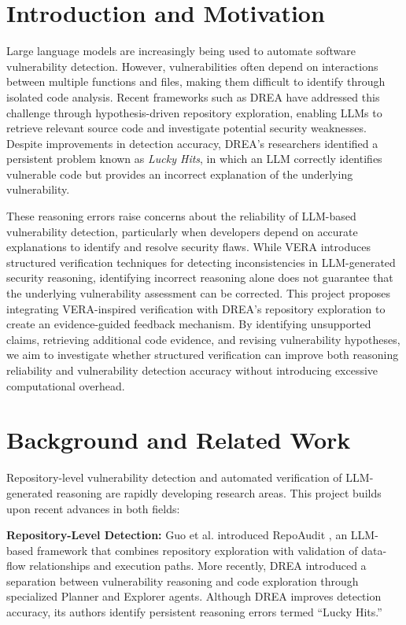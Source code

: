 \documentclass[sigconf,nonacm]{acmart}
\begin{document}
\section{Introduction and Motivation}
Large language models are increasingly being used to automate software vulnerability detection. However, vulnerabilities often depend on interactions between multiple functions and files, making them difficult to identify through isolated code analysis. Recent frameworks such as DREA have addressed this challenge through hypothesis-driven repository exploration, enabling LLMs to retrieve relevant source code and investigate potential security weaknesses. Despite improvements in detection accuracy, DREA's researchers identified a persistent problem known as \emph{Lucky Hits}, in which an LLM correctly identifies vulnerable code but provides an incorrect explanation of the underlying vulnerability.


These reasoning errors raise concerns about the reliability of LLM-based vulnerability detection, particularly when developers depend on accurate explanations to identify and resolve security flaws. While VERA introduces structured verification techniques for detecting inconsistencies in LLM-generated security reasoning, identifying incorrect reasoning alone does not guarantee that the underlying vulnerability assessment can be corrected. This project proposes integrating VERA-inspired verification with DREA's repository exploration to create an evidence-guided feedback mechanism. By identifying unsupported claims, retrieving additional code evidence, and revising vulnerability hypotheses, we aim to investigate whether structured verification can improve both reasoning reliability and vulnerability detection accuracy without introducing excessive computational overhead.

\section{Background and Related Work}

Repository-level vulnerability detection and automated verification of LLM-generated reasoning are rapidly developing research areas. This project builds upon recent advances in both fields:

\textbf{Repository-Level Detection:} Guo et al. introduced RepoAudit \cite{repoaudit}, an LLM-based framework that combines repository exploration with validation of data-flow relationships and execution paths. More recently, DREA \cite{drea} introduced a separation between vulnerability reasoning and code exploration through specialized Planner and Explorer agents. Although DREA improves detection accuracy, its authors identify persistent reasoning errors termed ``Lucky Hits.''
\end{document}
